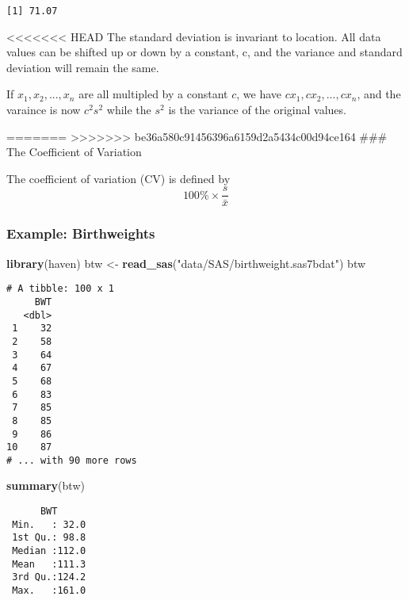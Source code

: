 \documentclass[12pt,]{article}
\newenvironment{Shaded}{\begin{snugshade}}{\end{snugshade}}
\newcommand{\KeywordTok}[1]{\textcolor[rgb]{0.13,0.29,0.53}{\textbf{#1}}}
\newcommand{\NormalTok}[1]{#1}
\newcommand{\StringTok}[1]{\textcolor[rgb]{0.31,0.60,0.02}{#1}}
\begin{document}
\begin{verbatim}
[1] 71.07
\end{verbatim}

\textless{}\textless{}\textless{}\textless{}\textless{}\textless{}\textless{}
HEAD The standard deviation is invariant to location. All data values
can be shifted up or down by a constant, c, and the variance and
standard deviation will remain the same.

If \(x_1, x_2, ..., x_n\) are all multipled by a constant \(c\), we have
\(cx_1, cx_2, ..., cx_n\), and the varaince is now \(c^2s^2\) while the
\(s^2\) is the variance of the original values.

=======
\textgreater{}\textgreater{}\textgreater{}\textgreater{}\textgreater{}\textgreater{}\textgreater{}
be36a580c91456396a6159d2a5434c00d94ce164 \#\#\# The Coefficient of
Variation

The coefficient of variation (CV) is defined by
\[100\%\times\frac{s}{\bar{x}}\]

\hypertarget{example-birthweights}{%
\subsubsection{Example: Birthweights}\label{example-birthweights}}

\begin{Shaded}
\begin{Highlighting}[]
\KeywordTok{library}\NormalTok{(haven)}
\NormalTok{btw <-}\StringTok{ }\KeywordTok{read_sas}\NormalTok{(}\StringTok{"data/SAS/birthweight.sas7bdat"}\NormalTok{)}
\NormalTok{btw}
\end{Highlighting}
\end{Shaded}

\begin{verbatim}
# A tibble: 100 x 1
     BWT
   <dbl>
 1    32
 2    58
 3    64
 4    67
 5    68
 6    83
 7    85
 8    85
 9    86
10    87
# ... with 90 more rows
\end{verbatim}

\begin{Shaded}
\begin{Highlighting}[]
\KeywordTok{summary}\NormalTok{(btw)}
\end{Highlighting}
\end{Shaded}

\begin{verbatim}
      BWT       
 Min.   : 32.0  
 1st Qu.: 98.8  
 Median :112.0  
 Mean   :111.3  
 3rd Qu.:124.2  
 Max.   :161.0  
\end{verbatim}
\end{document}
